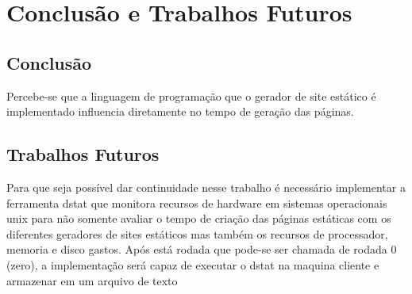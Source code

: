 \chapter{Conclusão e Trabalhos Futuros}
\section{Conclusão}
Percebe-se que a linguagem de programação que o gerador de site estático é implementado influencia diretamente no tempo de geração das páginas.

\section{Trabalhos Futuros}
Para que seja possível dar continuidade nesse trabalho é necessário implementar a ferramenta dstat que monitora recursos de hardware em sistemas operacionais unix para não somente avaliar o tempo de criação das páginas estáticas com os diferentes geradores de sites estáticos mas também os recursos de processador, memoria e disco gastos. Após está rodada que pode-se ser chamada de rodada 0 (zero), a implementação será capaz de executar o dstat na maquina cliente e armazenar em um arquivo de texto

